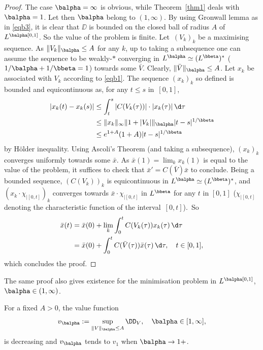 \begin{proof} The case $\balpha=\infty$ is obvious, while Theorem~\ref{thm1} deals with
$\balpha=1$. Let then $\balpha$ belong to $(1,\infty)$. By using Gronwall lemma as in
\eqref{eqb3}, it is clear that $\DD$ is bounded on the closed ball of radius $A$ of
$L^\balpha[0,1]$. So the value of the problem is finite. Let~$(V_k)_k$ be a maximising
sequence. As $\|V_k\|_\balpha \leq A$ for any $k$, up to taking a subsequence one can
assume the sequence to be weakly-$*$ converging in $L^\balpha \simeq (L^\bbeta)^*$
($1/\balpha+1/\bbeta=1$) towards some $\bar{V}$. Clearly, $\|\bar{V}\|_\balpha \leq A$.
Let $x_k$ be associated with $V_k$ according to \eqref{eqb1}. The sequence $(x_k)_k$
so defined is bounded and equicontinuous as, for any $t \leq s$ in~$[0,1]$,\vspace*{-3pt}
\begin{align*}
|x_k(t)-x_k(s)| & \leq \int_t^s |C(V_k(\tau))|\cdot|x_k(\tau)|\,\d\tau \\
& \leq \|x_k\|_\infty \|1+|V_k|\|_\balpha |t-s|^{1/\bbeta}\\
& \leq e^{1+A} (1+A) |t-s|^{1/\bbeta}
\end{align*}
by Hölder inequality. Using Ascoli's Theorem (and taking a subsequence), $(x_k)_k$
converges uniformly towards some $\bar{x}$. As $\bar{x}(1)=\lim_k x_k(1)$ is equal to
the value of the problem, it suffices to check that $\bar{x}'=C(\bar{V})\bar{x}$ to
conclude. Being a bounded sequence, $(C(V_k))_k$ is equicontinuous in $L^\balpha \simeq
(L^\bbeta)^*$, and $(x_k \cdot \chi_{|[0,t]})_k$ converges towards
$\bar{x} \cdot \chi_{|[0,t]}$
in $L^\bbeta$ for any $t$ in $[0,1]$ ($\chi_{|[0,t]}$ denoting the characteristic
function of the interval~$[0,t]$).~So\vspace*{-3pt}\enlargethispage{\baselineskip}%
\begin{align*}
\bar{x}(t) &= \bar{x}(0) + \lim_k \int_0^t C(V_k(\tau))x_k(\tau)\,\d\tau\\
&= \bar{x}(0) + \int_0^t C(\bar{V}(\tau))\bar{x}(\tau)\,\d\tau,
		 \quad t \in [0,1],
\end{align*}
which concludes the proof.
\end{proof}

\begin{remark} The same proof also gives existence for the minimisation problem in
$L^\balpha[0,1]$, $\balpha \in (1,\infty)$.
\end{remark}

\begin{prop} For a fixed $A>0$, the value function
\[
v_\balpha := \sup_{\|V\|_\balpha \leq A} \DD_V,\quad \balpha \in [1,\infty],
\]
is decreasing and $v_\balpha$ tends to $v_1$ when $\balpha \to 1+$.
\end{prop}

